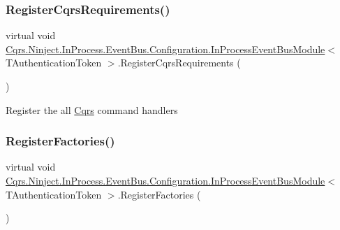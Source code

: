 \subsubsection{\texorpdfstring{Register\+Cqrs\+Requirements()}{RegisterCqrsRequirements()}}
{\footnotesize\ttfamily virtual void \hyperlink{classCqrs_1_1Ninject_1_1InProcess_1_1EventBus_1_1Configuration_1_1InProcessEventBusModule}{Cqrs.\+Ninject.\+In\+Process.\+Event\+Bus.\+Configuration.\+In\+Process\+Event\+Bus\+Module}$<$ T\+Authentication\+Token $>$.Register\+Cqrs\+Requirements (\begin{DoxyParamCaption}{ }\end{DoxyParamCaption})\hspace{0.3cm}{\ttfamily [virtual]}}



Register the all \hyperlink{namespaceCqrs}{Cqrs} command handlers 

\mbox{\label{classCqrs_1_1Ninject_1_1InProcess_1_1EventBus_1_1Configuration_1_1InProcessEventBusModule_a2fddbdd70a085bbbe1647a2d280e32e4_a2fddbdd70a085bbbe1647a2d280e32e4}} 
\subsubsection{\texorpdfstring{Register\+Factories()}{RegisterFactories()}}
{\footnotesize\ttfamily virtual void \hyperlink{classCqrs_1_1Ninject_1_1InProcess_1_1EventBus_1_1Configuration_1_1InProcessEventBusModule}{Cqrs.\+Ninject.\+In\+Process.\+Event\+Bus.\+Configuration.\+In\+Process\+Event\+Bus\+Module}$<$ T\+Authentication\+Token $>$.Register\+Factories (\begin{DoxyParamCaption}{ }\end{DoxyParamCaption})\hspace{0.3cm}{\ttfamily [virtual]}}



